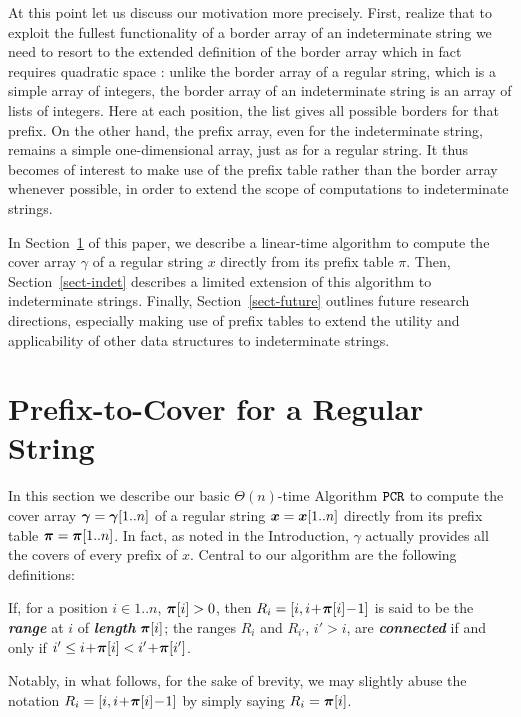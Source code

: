 \documentclass[runningheads,a4paper]{llncs}
\def\s#1{\mbox{\boldmath $#1$}}
\def\+{\!+\!}
\def\-{\!-\!}
\def\itbf#1{\textit{\textbf{#1}}}
\def\PCR{\tt{PCR}}
\begin{document}
At this point let us discuss our motivation more precisely. First,
realize that to exploit the fullest functionality of a border array of an
indeterminate string we need to resort to the extended definition of the border
array which in fact requires quadratic space \cite{HS03,NRR12,BRS09}:
unlike the border array of a regular string, which is a simple array of
integers, the border array of an indeterminate string is an array of lists of
integers. Here at each position, the list gives all possible borders for that
prefix. On the other hand, the prefix array, even for the indeterminate string,
remains a simple one-dimensional array, just as for a regular string. It thus
becomes of interest to make use of the prefix table rather than the border array
whenever possible, in order to extend the scope of computations to indeterminate
strings.


In Section~\ref{sect-pcr} of this paper, we describe a linear-time
algorithm to compute the cover array \s{\gamma}
of a regular string \s{x} directly from its prefix table \s{\pi}. Then,
Section~\ref{sect-indet} describes a limited extension of this algorithm to
indeterminate strings.
Finally, Section~\ref{sect-future} outlines future research directions,
especially making use of prefix tables to extend the utility and applicability
of other data structures to indeterminate strings.

\section{Prefix-to-Cover for a Regular String}\label{sect-pcr}
In this section we describe our basic $\Theta(n)$-time Algorithm $\PCR$ to
compute the cover array $\s{\gamma} = \s{\gamma}[1..n]$ of a regular string
$\s{x} = \s{x}[1..n]$ directly from its prefix table $\s{\pi} = \s{\pi}[1..n]$.
In fact, as noted in the Introduction, \s{\gamma} actually provides
all the covers of every prefix of \s{x}.
Central to our algorithm are the following definitions:

\begin{definition}\label{defn-range}
If, for a position $i \in 1..n$, $\s{\pi}[i] > 0$,
then $R_i = [i,i\+ \s{\pi}[i]\- 1]$ is said to be
the \itbf{range} at $i$ of \itbf{length} $\s{\pi}[i]$;
the ranges $R_i$ and $R_{i'}$, $i' > i$, are \itbf{connected}
if and only if $i' \le i\+ \s{\pi}[i] < i'\+ \s{\pi}[i']$.
\end{definition}
 
Notably, in what follows, for the sake of brevity, we may slightly abuse the
notation $R_i = [i,i\+ \s{\pi}[i]\- 1]$ by simply saying $R_i = \s{\pi}[i]$.
\end{document}
